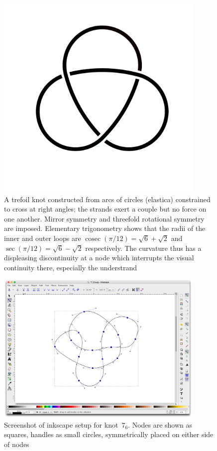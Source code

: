 \documentclass{birkjour}
\theoremstyle{definition}
\theoremstyle{remark}
\numberwithin{equation}{section}
\begin{document}
\begin{figure}[h]
  \centering
    \includegraphics[width=10cm]{trefoil_circles_post_inkscape.pdf}
\caption{A trefoil knot \label{trefoil_circles} constructed from arcs
  of circles (elastica) constrained to cross at right angles; the
  strands exert a couple but no force on one another.  Mirror symmetry
  and threefold rotational symmetry are imposed.  Elementary
  trigonometry shows that the radii of the inner and outer loops are
  $\operatorname{cosec}(\pi/12)=\sqrt{6}+\sqrt{2}$ and
  $\sec(\pi/12)=\sqrt{6}-\sqrt{2}$ respectively.  The curvature thus
  has a displeasing discontinuity at a node which interrupts the
  visual continuity there, especially the understrand}
\end{figure}

\begin{figure}[h]
  \centering
    \includegraphics[width=10cm]{screenshot_inkscape_7_6.png}
\caption{Screenshot of inkscape\label{screenshot_inkscape_7_6} setup
  for knot~$7_6$.  Nodes are shown as squares, handles as small
  circles, symmetrically placed on either side of nodes}
\end{figure}
\end{document}

